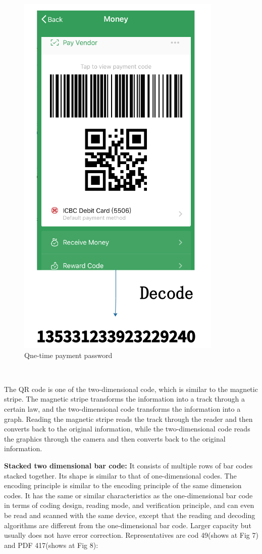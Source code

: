 \documentclass[journal]{IEEEtran}
\begin{document}
\begin{figure}[htbp]
\centerline{\includegraphics[scale=0.46]{QR_decode.png}}
\caption{Qne-time payment password}
\label{fig}
\end{figure}


\


The QR code is one of the two-dimensional code, which is similar to the magnetic stripe. The magnetic stripe transforms the information into a track through a certain law, and the two-dimensional code transforms the information into a graph. Reading the magnetic stripe reads the track through the reader and then converts back to the original information, while the two-dimensional code reads the graphics through the camera and then converts back to the original information.

\textbf{Stacked two dimensional bar code:} It consists of multiple rows of bar codes stacked together. Its shape is similar to that of one-dimensional codes. The encoding principle is similar to the encoding principle of the same dimension codes. It has the same or similar characteristics as the one-dimensional bar code in terms of coding design, reading mode, and verification principle, and can even be read and scanned with the same device, except that the reading and decoding algorithms are different from the one-dimensional bar code. Larger capacity but usually does not have error correction.
Representatives are cod 49(shows at Fig 7) and PDF 417(shows at Fig 8):
\end{document}

